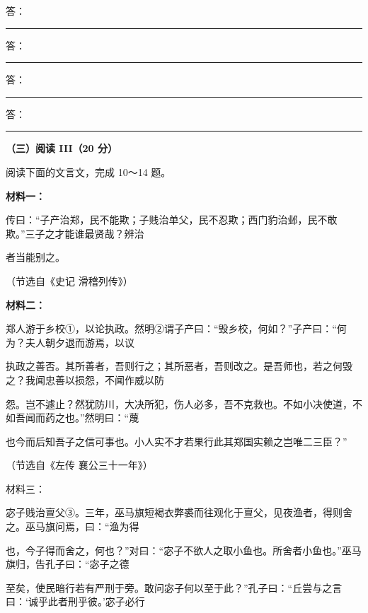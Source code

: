 \documentclass[UTF8,a4paper,fontset=fandol]{ctexart}
\begin{document}
\noindent 答：\rule{0.88\linewidth}{0.35pt}\par
\noindent 答：\rule{0.88\linewidth}{0.35pt}\par
\noindent 答：\rule{0.88\linewidth}{0.35pt}\par
\noindent 答：\rule{0.88\linewidth}{0.35pt}\par
\vspace{0.35em}\par
\vspace{0.25em}\textbf{（三）阅读 III（20 分）}\par
阅读下面的文言文，完成 10～14 题。\par
\textbf{材料一：}\par
\hspace*{1.8em}传曰：“子产治郑，民不能欺；子贱治单父，民不忍欺；西门豹治邺，民不敢欺。”三子之才能谁最贤哉？辨治\par
者当能别之。\par
\hspace*{1.8em}（节选自《史记        滑稽列传》）\par
\vspace{0.35em}\par
\textbf{材料二：}\par
\hspace*{1.8em}郑人游于乡校①，以论执政。然明②谓子产曰：“毁乡校，何如？”子产曰：“何为？夫人朝夕退而游焉，以议\par
执政之善否。其所善者，吾则行之；其所恶者，吾则改之。是吾师也，若之何毁之？我闻忠善以损怨，不闻作威以防\par
怨。岂不遽止？然犹防川，大决所犯，伤人必多，吾不克救也。不如小决使道，不如吾闻而药之也。”然明曰：“蔑\par
也今而后知吾子之信可事也。小人实不才若果行此其郑国实赖之岂唯二三臣？”\par
\hspace*{1.8em}（节选自《左传        襄公三十一年》）\par
\vspace{0.35em}\par
材料三：\par
\hspace*{1.8em}宓子贱治{亶父}③。三年，巫马旗短褐衣弊裘而往观化于{亶父}，见夜渔者，得则舍之。巫马旗问焉，曰：“渔为得\par
也，今子得而舍之，何也？”对曰：“宓子不欲人之取小鱼也。所舍者小鱼也。”巫马旗归，告孔子曰：“宓子之德\par
至矣，使民暗行若有严刑于旁。敢问宓子何以至于此？”孔子曰：“丘尝与之言曰：‘诚乎此者刑乎彼。’宓子必行\par
\end{document}
